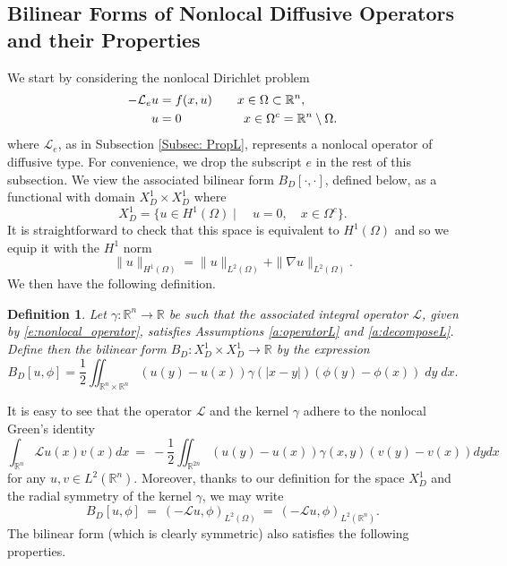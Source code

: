 \documentclass[11pt]{amsart}   	%
\theoremstyle{plain}
\numberwithin{equation}{section}
\newtheorem{definition}[thm]{Definition}
\def\ga{\gamma}
\def\R{\mathbb{R}}
\def\Lin{\mathcal{L}}
\newcommand{\JMS}[1]{{\color{orange} {\bf J. Siktar:} [#1] }}
\begin{document}
\subsection{Bilinear Forms of Nonlocal Diffusive Operators and their Properties}\label{Subsec: BilinearFormB}
We start by considering the nonlocal Dirichlet problem
\begin{equation}\label{e:nonlocal_D}
\begin{split}
-\mathcal{L}_e u & = f(x,u) \qquad  x \in  \Omega \subset \mathbb{R}^n,\\
u & = 0 \hspace{1.75cm} x \in \Omega^c = \R^n \setminus \Omega.
\end{split}
\end{equation}
where $\mathcal{L}_e$, as in Subsection \ref{Subsec: PropL}, represents a nonlocal operator of diffusive type. For convenience, we drop the subscript $e$ in the rest of this subsection. We view the associated bilinear form $B_D[\cdot, \cdot]$, defined below, as a functional with domain $X^1_D  \times X^1_D $ where 
\[ X^1_D = \{ u \in H^1(\Omega) \mid \quad u =0, \quad x \in \Omega^c\}.\]
It is straightforward to check that this space is equivalent to $H^1(\Omega)$ and so we equip it with the $H^1$ norm
\[ \|u\|_{H^1(\Omega)} = \| u\|_{L^2(\Omega)} + \| \nabla u\|_{L^2(\Omega)}.\]
We then have the following definition.

\begin{definition}\label{d:bilinearform}
Let $\gamma: \R^n \longrightarrow \R$ be such that the associated integral operator $\mathcal{L}$, given by 
\eqref{e:nonlocal_operator}, satisfies Assumptions \ref{a:operatorL} and \ref{a:decomposeL}. 
Define then the bilinear form $B_D: X^1_D \times X^1_D \longrightarrow \R$ by the expression
\[ B_D[u,\phi] = \frac{1}{2} \iint_{\R^n\times \R^n }  (u(y) - u(x)) \gamma(|x-y|) (\phi(y) -\phi(x)) \;dy\;dx.\]
\end{definition}

It is easy to see that the operator $\Lin$ and the kernel $\ga$ adhere to the  nonlocal Green's identity%
\begin{equation}\label{Eq: NLGreen}
    \int_{\R^n}\Lin u(x) v(x) dx \ = \ -\frac{1}{2}\iint_{\R^{2n}}(u(y) - u(x))\ga(x, y)(v(y) - v(x))dydx 
\end{equation}
for any $u, v \in L^2(\R^n)$. Moreover, thanks to our definition for the space $X^1_D$ and the radial symmetry of the kernel $\gamma$, we may write
\begin{equation}\label{Eq:BilinearToL_D}
B_D[u,\phi] \ = \ (-\mathcal{L}u, \phi)_{L^2(\Omega)} \ = \ (-\mathcal{L}u, \phi)_{L^2(\R^n)}.
\end{equation}
The bilinear form (which is clearly symmetric) also satisfies the following properties.
\end{document}
